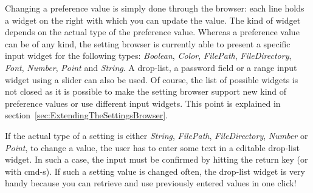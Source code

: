 \documentclass[a4paper,10pt,twoside]{book}
\begin{document}
Changing a preference value is simply done through the browser: each line holds a widget on the right with which you can update the value. The kind of widget depends on the actual type of the preference value. Whereas a preference value can be of any kind, the setting browser is currently able to present a specific input widget for the following types: \textit{Boolean}, \textit{Color}, \textit{FilePath}, \textit{FileDirectory}, \textit{Font}, \textit{Number}, \textit{Point} and \textit{String}. A drop-list, a password field or a range input widget using a slider can also be used. Of course, the list of possible widgets is not closed as it is possible to make the setting browser support new kind of preference values or use different input widgets. This point is explained in section~\ref{sec:ExtendingTheSettingsBrowser}.

If the actual type of a setting is either \textit{String}, \textit{FilePath}, \textit{FileDirectory}, \textit{Number} or \textit{Point},  to change a value, the user has to enter some text in a editable drop-list widget. In such a case, the input must be confirmed by hitting the return key (or with cmd-s). If such a setting value is changed often, the drop-list widget is very handy because you can retrieve and use previously entered values in one click!
\end{document}
